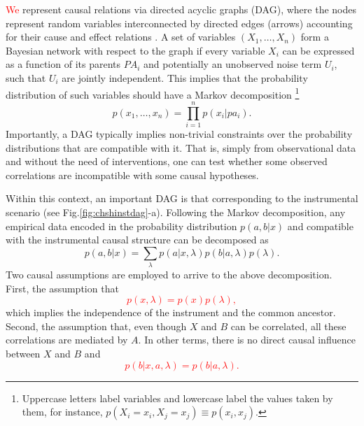 \documentclass[letterpaper]{article}
\begin{document}
\textcolor{red}{We} represent causal relations via directed acyclic graphs
(DAG), where the nodes represent random variables interconnected by directed
edges (arrows) accounting for their cause and effect relations \cite{pearlbook}.
A set of variables  $\left( X_1,\dots, X_n \right)$ form a Bayesian network with
respect to the graph if every variable $X_i$ can be expressed as a function of
its parents $PA_i$ and potentially an unobserved noise term $U_i$, such that
$U_i$ are jointly independent. This implies that the probability distribution of
such variables should have a Markov decomposition 
\footnote{Uppercase letters label variables and lowercase label the values taken
by them, for instance, $p(X_i =x_i, X_j = x_j) \equiv p(x_i, x_j)$.}
\begin{equation}
p(x_1,\dots,x_n)= \prod_{i=1}^{n} p(x_i \vert pa_i).    
\end{equation}
Importantly, a DAG typically implies non-trivial constraints over the
probability distributions that are compatible with it. That is, simply from
observational data and without the need of interventions, one can test whether
some observed correlations are incompatible with some causal hypotheses.

Within this context, an important DAG is that corresponding to the instrumental
scenario (see Fig.\ref{fig:chshinstdag}-a). Following the Markov decomposition, any
empirical data encoded in the probability distribution $p(a,b \vert x)$ and
compatible with the instrumental causal structure can be decomposed as
\begin{equation}
p(a,b \vert x) = \sum_{\lambda} p(a\vert x,\lambda) p(b\vert a,\lambda)p(\lambda).
\end{equation}
Two causal assumptions are employed to arrive to the above decomposition. First,
the assumption that
\textcolor{red}{
\begin{equation}
p(x,\lambda)=p(x)p(\lambda), 
\end{equation}}
which implies the independence of
the instrument and the common ancestor. Second, the assumption that, even though
$X$ and $B$ can be correlated, all these correlations are mediated by $A$. In
other terms, there is no direct causal influence between $X$ and $B$ and
\textcolor{red}{
\begin{equation}
p(b\vert x,a,\lambda)=p(b\vert a,\lambda).
\end{equation}}
\end{document}
